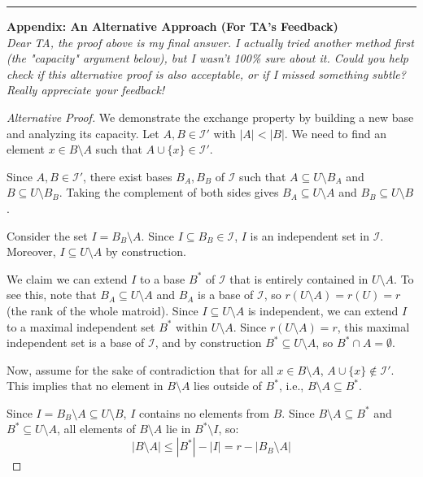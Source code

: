 \documentclass[12pt,a4paper]{article}
\theoremstyle{definition}
\begin{document}
\newpage
        \noindent\rule{\textwidth}{0.4pt} 
        \vspace{0.2cm}
        
        \textbf{\large Appendix: An Alternative Approach (For TA's Feedback)} \\
        \textit{Dear TA, the proof above is my final answer. I actually tried another method first (the "capacity" argument below), but I wasn't 100\% sure about it. Could you help check if this alternative proof is also acceptable, or if I missed something subtle? Really appreciate your feedback!}

        \begin{proof}[Alternative Proof]
        We demonstrate the exchange property by building a new base and analyzing its capacity.
        Let $A, B \in \mathcal{I}'$ with $|A| < |B|$. We need to find an element $x \in B \setminus A$ such that $A \cup \{x\} \in \mathcal{I}'$.

        Since $A, B \in \mathcal{I}'$, there exist bases $B_A, B_B$ of $\mathcal{I}$ such that $A \subseteq U \setminus B_A$ and $B \subseteq U \setminus B_B$. Taking the complement of both sides gives $B_A \subseteq U \setminus A$ and $B_B \subseteq U \setminus B$.

        Consider the set $I = B_B \setminus A$. Since $I \subseteq B_B \in \mathcal{I}$, $I$ is an independent set in $\mathcal{I}$. Moreover, $I \subseteq U \setminus A$ by construction.

        We claim we can extend $I$ to a base $B^*$ of $\mathcal{I}$ that is entirely contained in $U \setminus A$. To see this, note that $B_A \subseteq U \setminus A$ and $B_A$ is a base of $\mathcal{I}$, so $r(U \setminus A) = r(U) = r$ (the rank of the whole matroid). Since $I \subseteq U \setminus A$ is independent, we can extend $I$ to a maximal independent set $B^*$ within $U \setminus A$. Since $r(U \setminus A) = r$, this maximal independent set is a base of $\mathcal{I}$, and by construction $B^* \subseteq U \setminus A$, so $B^* \cap A = \emptyset$.

        Now, assume for the sake of contradiction that for all $x \in B \setminus A$, $A \cup \{x\} \notin \mathcal{I}'$. This implies that no element in $B \setminus A$ lies outside of $B^*$, i.e., $B \setminus A \subseteq B^*$.

        Since $I = B_B \setminus A \subseteq U \setminus B$, $I$ contains no elements from $B$. Since $B \setminus A \subseteq B^*$ and $B^* \subseteq U \setminus A$, all elements of $B \setminus A$ lie in $B^* \setminus I$, so:
        $$|B \setminus A| \leq |B^*| - |I| = r - |B_B \setminus A|$$


\end{proof}
\end{document}
